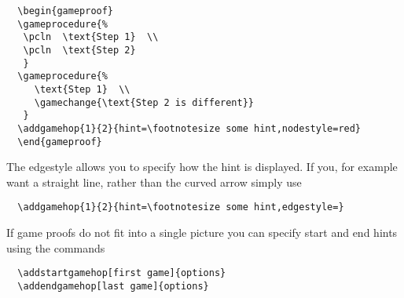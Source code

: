 \documentclass[a4paper]{report}
\begin{document}
  \vspace{1ex}
  \begin{center}
  \begin{gameproof}
  \end{gameproof}
  \end{center}
  \begin{lstlisting}
  \begin{gameproof}
  \gameprocedure{%
   \pcln  \text{Step 1}  \\
   \pcln  \text{Step 2}  
   }
  \gameprocedure{%
	 \text{Step 1}  \\
	 \gamechange{\text{Step 2 is different}}  
   }
  \addgamehop{1}{2}{hint=\footnotesize some hint,nodestyle=red}
  \end{gameproof}
  \end{lstlisting}
  The edgestyle allows you to specify how the hint is displayed. If you, for example want a straight line, rather than the curved arrow simply
  use 
  \begin{lstlisting}
  \addgamehop{1}{2}{hint=\footnotesize some hint,edgestyle=}
  \end{lstlisting}
  
  
  
  If game proofs do not fit into a single picture you can specify start and end hints using the commands
  \begin{lstlisting}
  \addstartgamehop[first game]{options}
  \addendgamehop[last game]{options}
  \end{lstlisting}
  
  \begin{center}
  \begin{gameproof}
  \end{gameproof}
  \end{center}
  
\end{document}
